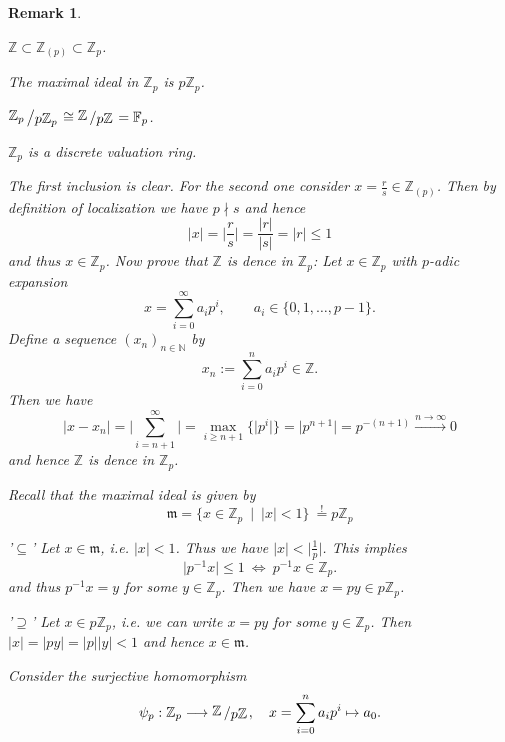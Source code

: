 \documentclass[11pt]{book}
\newtheorem{remark}[theorem]{Remark}
\theoremstyle{nonumberbreak}
\newenvironment{pr}[1][]{\ifthenelse{\equal{#1}{}}{\proof}{\proof[#1]}\rm}{\endproof}
\newcommand{\slant}[2]{{\raisebox{.1em}{$#1$}\left/\raisebox{-.1em}{$#2$}\right.}}
\begin{document}
\begin{spacing}{1.3}
\begin{remark}%
\begin{compactenum}
\item $\mathbb{Z} \subset \mathbb{Z}_{( p)} \subset \mathbb{Z}_p$.
\item The maximal ideal in $\mathbb{Z}_p$ is $p\mathbb{Z}_p$.
\item $\slant{\mathbb{Z}_p}{p\mathbb{Z}_p} \cong \slant{\mathbb{Z}}{p\mathbb{Z}} =\mathbb{F}_p$.
\item $\mathbb{Z}_p$ is a discrete valuation ring. 
\end{compactenum}
\begin{pr}
\begin{compactenum}
\item The first inclusion is clear. For the second one consider $x =\frac{r}{s} \in \mathbb{Z}_{( p )}$. Then by definition of localization we have $p \nmid s$ and hence
$$\vert x \vert=\Big\vert \frac{r}{s}\Big\vert=\frac{|r|}{|s|}=|r|\leqslant 1$$
and thus $x\in \mathbb{Z}_{p}$. Now prove that $\mathbb{Z}$ is dence in $\mathbb{Z}_p$:
Let $x \in \mathbb{Z}_p$ with $p$-adic expansion
$$x=\sum_{i=0}^{\infty}a_i p^{i}, \qquad a_i \in \{0,1, \ldots, p-1\}.$$
Define a sequence $(x_n)_{n \in \mathbb{N}}$ by
$$x_n:=\sum_{i=0}^n a_i p^{i} \in \mathbb{Z}.$$
Then we have
$$\vert x-x_n\vert =\Big\vert \sum_{i=n+1}^{\infty}\Big\vert = \max_{i\geqslant n+1}\{\vert p^{i} \vert \}=\big\vert p^{n+1} \big\vert =p^{-(n+1)} \xrightarrow{n \to \infty} 0 $$
and hence $\mathbb{Z}$ is dence in $\mathbb{Z}_p$. 
\item Recall that the maximal ideal is given by
$$\mathfrak{m}=\{x \in \mathbb{Z}_p \ \mid \ |x|<1 \} \ \overset{!}{=} p \mathbb{Z}_p$$
\begin{compactenum}
\item['$\subseteq$'] Let $x \in \mathfrak{m}$, i.e. $|x|<1$. Thus we have $|x|< \big\vert \frac{1}{p} \big\vert$.
This implies
$$\vert p^{-1}  x \vert \leqslant 1 \ \Longleftrightarrow \ p^{-1} x \in \mathbb{Z}_p.$$
and thus $p^{-1}x = y$ for some $y \in \mathbb{Z}_p$. Then we have $x=p y \in p\mathbb{Z}_p$.
\item['$\supseteq$'] Let $x \in p\mathbb{Z}_p$, i.e. we can write $x=py$ for some $y \in \mathbb{Z}_p$. Then 
$|x|=|py|=|p||y|<1$ and hence $x\in \mathfrak{m}$.
\end{compactenum}
\item Consider the surjective homomorphism
$$\psi_p: \mathbb{Z}_p \longrightarrow \slant{\mathbb{Z}}{p \mathbb{Z}}, \quad x=\sum_{i=0}^n a_ip^{i} \mapsto a_0.$$

\end{compactenum}
\end{pr}
\end{remark}
\end{spacing}
\end{document}
